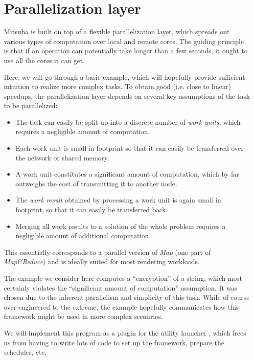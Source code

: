 \section{Parallelization layer}
\label{sec:parallelization}
Mitsuba is built on top of a flexible parallelization layer, which spreads out
various types of computation over local and remote cores.
The guiding principle is that if an operation can potentially take longer than a
few seconds, it ought to use all the cores it can get.

Here, we will go through a basic example, which will hopefully provide sufficient intuition
to realize more complex tasks.
To obtain good (i.e. close to linear) speedups, the parallelization layer depends on
several key assumptions of the task to be parallelized:
\begin{itemize}
\item The task can easily be split up into a discrete number of \emph{work units}, which requires a negligible amount of computation.
\item Each work unit is small in footprint so that it can easily be transferred over the network or shared memory.
\item A work unit constitutes a significant amount of computation, which by far outweighs the cost of transmitting it to another node.
\item The \emph{work result} obtained by processing a work unit is again small in footprint, so that it can easily be transferred back.
\item Merging all work results to a solution of the whole problem requires a negligible amount of additional computation.
\end{itemize}
This essentially corresponds to a parallel version of \emph{Map} (one part of \emph{Map\&Reduce}) and is
ideally suited for most rendering workloads.

The example we consider here computes a  ``encryption'' of a string, which
most certainly violates the ``significant amount of computation'' assumption.
It was chosen due to the inherent parallelism and simplicity of this task.
While of course over-engineered to the extreme, the example hopefully
communicates how this framework might be used in more complex scenarios.

We will implement this program as a plugin for the utility launcher , which
frees us from having to write lots of code to set up the framework, prepare the
scheduler, etc.

